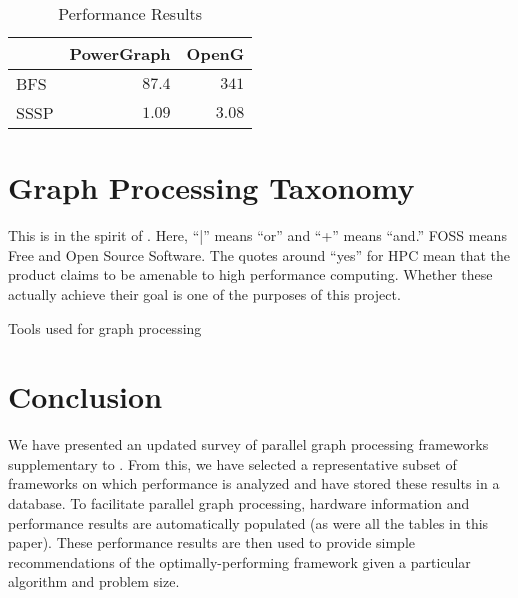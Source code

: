 \documentclass[11pt]{article}
\begin{document}
\begin{table}[htb]
	\centering
	\begin{tabular}{l|r|r|}
	 & PowerGraph & OpenG \\ \hline
	BFS & $87.4$ & $341$ \\ \hline
	SSSP & $1.09$ & $3.08$ \\ \hline
	\end{tabular}
	\caption{Performance Results}
	\label{tab:perf}
\end{table}

\section{Graph Processing Taxonomy}
This is in the spirit of \cite{Doekemeijer:2015:GPFSurvey}. Here, ``|'' means ``or'' and ``+'' means ``and.'' FOSS means Free and Open Source Software. The quotes around ``yes'' for HPC mean that the product claims to be amenable to high performance computing. Whether these actually achieve their goal is one of the purposes of this project.
\begin{savenotes}
	\begin{table}
		\centering
		\caption{Tools used for graph processing}
		\label{tab:frameworks}
	\end{table}
\end{savenotes}

\section{Conclusion} %
We have presented an updated survey of parallel graph processing frameworks supplementary to \cite{Doekemeijer:2015:GPFSurvey}. From this, we have selected a representative subset of frameworks on which performance is analyzed and have stored these results in a database. To facilitate parallel graph processing, hardware information and performance results are automatically populated (as were all the tables in this paper). These performance results are then used to provide simple recommendations of the optimally-performing framework given a particular algorithm and problem size.



\end{document}
